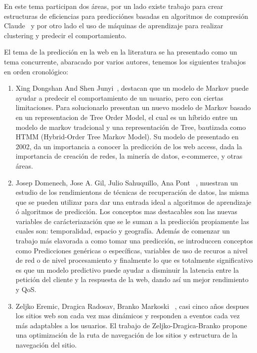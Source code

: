 \documentclass{udparticle}
\begin{document}

En este tema participan dos áreas, por un lado existe trabajo para crear estructuras de eficiencias para predicciónes basadas en algoritmos de compresión Claude~\cite{BWT} y por otro lado el uso de máquinas de aprendizaje para realizar clustering y predecir el comportamiento.

El tema de la predicción en la web en la literatura se ha presentado como un tema concurrente, abaracado por varios autores, tenemos los siguientes trabajos en orden cronológico:


\begin{enumerate}

  \item Xing Dongshan And Shen Junyi~\cite{tmmd}, destacan que un modelo de Markov puede ayudar a predecir el comportamiento de un usuario, pero con ciertas limitaciones.
  Para solucionarlo presentan un nuevo modelo de Markov basado en un representacion de Tree Order Model, el cual es un híbrido entre un modelo de markov tradcional y una representación de Tree, bautizada como HTMM (Hybrid-Order Tree Markov Model). 
  Su modelo de presentado en 2002, da un importancia a conocer la predicción de los web access, dada la importancia de creación de redes, la minería de datos, e-commerce, y otras áreas.  


  \item Josep Domenech, Jose A. Gil, Julio Sahuquillo, Ana Pont ~\cite{domenech}, muestran un estudio de los rendimientons de técnicas de recuperación de datos, las misma que se pueden utilizar para dar una entrada ideal a algoritmos de aprendizaje ó algoritmos de predicción. Los conceptos mas destacables son las nuevas variables de carácteriazación que se le suman a la predicción propiamente las cuales son: temporalidad, espacio y  geografía. 
  Además de comenzar un trabajo más elavorada a como tomar una predicción, se introduccen conceptos como Predicciones genéricas o específicas, variables de uso de recuros a nivel de red o de nivel procesamiento y finalmente lo que es totalmente significativo es que un modelo predictivo puede ayudar a disminuir la latencia entre la petición del cliente y la respuesta de la web, dando así un mejor rendimiento y QoS.


  \item Zeljko Eremic, Dragica Radosav, Branko Markoski ~\cite{Dragica}, casi cinco años despues los sitios web son cada vez mas dinámicos y responden a eventos cada vez más adaptables a los usuarios. El trabajo de Zeljko-Dragica-Branko propone una optimización de la ruta de navegación de los sitios y estructura de la navegación del sitio. 



\end{enumerate}
\end{document}
